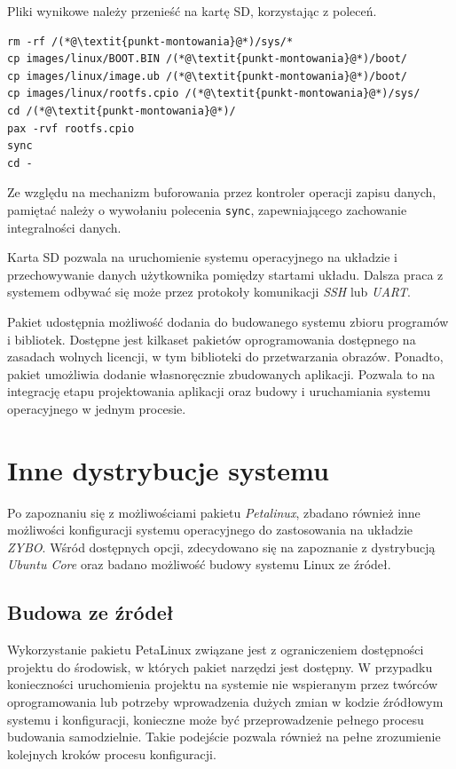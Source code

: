 Pliki wynikowe należy przenieść na kartę SD, korzystając z poleceń.

\begin{lstlisting}[breaklines=true]
rm -rf /(*@\textit{punkt-montowania}@*)/sys/*
cp images/linux/BOOT.BIN /(*@\textit{punkt-montowania}@*)/boot/
cp images/linux/image.ub /(*@\textit{punkt-montowania}@*)/boot/
cp images/linux/rootfs.cpio /(*@\textit{punkt-montowania}@*)/sys/
cd /(*@\textit{punkt-montowania}@*)/
pax -rvf rootfs.cpio
sync
cd -
\end{lstlisting}

Ze względu na mechanizm buforowania przez kontroler operacji zapisu danych, pamiętać należy o wywołaniu polecenia \texttt{sync}, zapewniającego zachowanie integralności danych.

Karta SD pozwala na uruchomienie systemu operacyjnego na układzie i przechowywanie danych użytkownika pomiędzy startami układu. Dalsza praca z systemem odbywać się może przez protokoły komunikacji \emph{SSH} lub \emph{UART}.

Pakiet udostępnia możliwość dodania do budowanego systemu zbioru programów i bibliotek. Dostępne jest kilkaset pakietów oprogramowania dostępnego na zasadach wolnych licencji, w tym biblioteki do przetwarzania obrazów. Ponadto, pakiet umożliwia dodanie własnoręcznie zbudowanych aplikacji. Pozwala to na integrację etapu projektowania aplikacji oraz budowy i uruchamiania systemu operacyjnego w jednym procesie.

\section{Inne dystrybucje systemu}
Po zapoznaniu się z możliwościami pakietu \emph{Petalinux}, zbadano również inne możliwości konfiguracji systemu operacyjnego do zastosowania na układzie \emph{ZYBO}. Wśród dostępnych opcji, zdecydowano się na zapoznanie z dystrybucją \emph{Ubuntu Core} oraz badano możliwość budowy systemu Linux ze źródeł.

\subsection{Budowa ze źródeł}
Wykorzystanie pakietu PetaLinux związane jest z ograniczeniem dostępności projektu do środowisk, w których pakiet narzędzi jest dostępny. W przypadku konieczności uruchomienia projektu na systemie nie wspieranym przez twórców oprogramowania lub potrzeby wprowadzenia dużych zmian w kodzie źródłowym systemu i konfiguracji, konieczne może być przeprowadzenie pełnego procesu budowania samodzielnie. Takie podejście pozwala również na pełne zrozumienie kolejnych kroków procesu konfiguracji.


